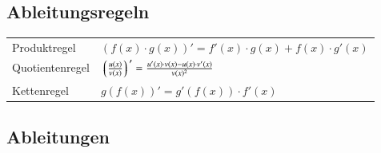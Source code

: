 

\subsection{Ableitungsregeln}
\renewcommand{\arraystretch}{1.5}
\begin{tabular}{ll}
    Produktregel    & $ (f(x) \cdot g(x))' = f'(x) \cdot g(x) + f(x) \cdot g'(x) $ \\
    Quotientenregel & $ \left\lgroup \frac{u(x)}{v(x)} \right\rgroup  ' = \frac{u'(x) \cdot v(x) - u(x) \cdot v'(x)}{v(x) ^2}$ \\
    Kettenregel     & $ g(f(x))' =  g'(f(x)) \cdot f'(x)$
\end{tabular}
\renewcommand{\arraystretch}{1}


\subsection{Ableitungen}

\begin{minipage}[t]{0.48\columnwidth}
\end{minipage}
\hfill
\begin{minipage}[t]{0.48\columnwidth}
\end{minipage}



